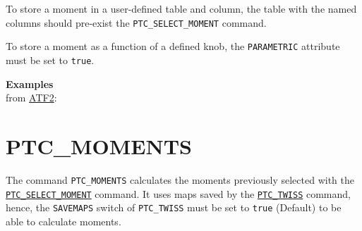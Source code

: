 To store a moment in a user-defined table and column, the table with the
named columns should pre-exist the \texttt{PTC\_SELECT\_MOMENT} command.

To store a moment as a function of a defined knob, the
\texttt{PARAMETRIC} attribute must be set to \texttt{true}.

\textbf{Examples}\\
from
\href{http://cern.ch/frs/mad-X_examples/ptc_madx_interface/moments/moments.madx}{ATF2}:




 
% 


\section{PTC\_MOMENTS}
\label{sec:ptc-moments}

The command \texttt{PTC\_MOMENTS} calculates the moments previously
selected with the
\hyperref[sec:ptc-select-moment]{\texttt{PTC\_SELECT\_MOMENT}} 
command.  It uses maps saved by the
\hyperref[sec:ptc-twiss]{\texttt{PTC\_TWISS}} command, hence, 
the \texttt{SAVEMAPS} switch of \texttt{PTC\_TWISS} must be set to
\texttt{true} (Default) to be able to calculate moments.

